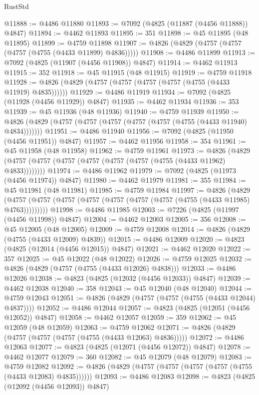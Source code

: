 \begin{lexlean}{RustStd}
\begin{coremodule}
@11888 := @4486 @11880
@11893 := @7092 (@4825 (@11887 (@4456 @11888)) @4847)
@11894 := @4462 @11893
@11895 := 351
@11898 := @45 @11895 (@48 @11895)
@11899 := @4759 @11898
@11907 := @4826 (@4829 (@4757 (@4757 (@4757 (@4755 (@4433 @11899) @4836)))))
@11908 := @4486 @11899
@11913 := @7092 (@4825 (@11907 (@4456 @11908)) @4847)
@11914 := @4462 @11913
@11915 := 352
@11918 := @45 @11915 (@48 @11915)
@11919 := @4759 @11918
@11928 := @4826 (@4829 (@4757 (@4757 (@4757 (@4757 (@4755 (@4433 @11919) @4835))))))
@11929 := @4486 @11919
@11934 := @7092 (@4825 (@11928 (@4456 @11929)) @4847)
@11935 := @4462 @11934
@11936 := 353
@11939 := @45 @11936 (@48 @11936)
@11940 := @4759 @11939
@11950 := @4826 (@4829 (@4757 (@4757 (@4757 (@4757 (@4757 (@4755 (@4433 @11940) @4834)))))))
@11951 := @4486 @11940
@11956 := @7092 (@4825 (@11950 (@4456 @11951)) @4847)
@11957 := @4462 @11956
@11958 := 354
@11961 := @45 @11958 (@48 @11958)
@11962 := @4759 @11961
@11973 := @4826 (@4829 (@4757 (@4757 (@4757 (@4757 (@4757 (@4757 (@4755 (@4433 @11962) @4833))))))))
@11974 := @4486 @11962
@11979 := @7092 (@4825 (@11973 (@4456 @11974)) @4847)
@11980 := @4462 @11979
@11981 := 355
@11984 := @45 @11981 (@48 @11981)
@11985 := @4759 @11984
@11997 := @4826
    (@4829 (@4757 (@4757 (@4757 (@4757 (@4757 (@4757 (@4757 (@4755 (@4433 @11985) @4763)))))))))
@11998 := @4486 @11985
@12003 := @7226 (@4825 (@11997 (@4456 @11998)) @4847)
@12004 := @4462 @12003
@12005 := 356
@12008 := @45 @12005 (@48 @12005)
@12009 := @4759 @12008
@12014 := @4826 (@4829 (@4755 (@4433 @12009) @4839))
@12015 := @4486 @12009
@12020 := @4823 (@4825 (@12014 (@4456 @12015)) @4847)
@12021 := @4462 @12020
@12022 := 357
@12025 := @45 @12022 (@48 @12022)
@12026 := @4759 @12025
@12032 := @4826 (@4829 (@4757 (@4755 (@4433 @12026) @4838)))
@12033 := @4486 @12026
@12038 := @4823 (@4825 (@12032 (@4456 @12033)) @4847)
@12039 := @4462 @12038
@12040 := 358
@12043 := @45 @12040 (@48 @12040)
@12044 := @4759 @12043
@12051 := @4826 (@4829 (@4757 (@4757 (@4755 (@4433 @12044) @4837))))
@12052 := @4486 @12044
@12057 := @4823 (@4825 (@12051 (@4456 @12052)) @4847)
@12058 := @4462 @12057
@12059 := 359
@12062 := @45 @12059 (@48 @12059)
@12063 := @4759 @12062
@12071 := @4826 (@4829 (@4757 (@4757 (@4757 (@4755 (@4433 @12063) @4836)))))
@12072 := @4486 @12063
@12077 := @4823 (@4825 (@12071 (@4456 @12072)) @4847)
@12078 := @4462 @12077
@12079 := 360
@12082 := @45 @12079 (@48 @12079)
@12083 := @4759 @12082
@12092 := @4826 (@4829 (@4757 (@4757 (@4757 (@4757 (@4755 (@4433 @12083) @4835))))))
@12093 := @4486 @12083
@12098 := @4823 (@4825 (@12092 (@4456 @12093)) @4847)

\end{coremodule}
\end{lexlean}
